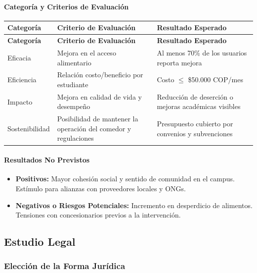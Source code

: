 \documentclass[letterpaper, 11pt]{report}
\begin{document}
\paragraph{Categoría y Criterios de Evaluación}
\begin{longtable}{|p{0.2\linewidth}|p{0.4\linewidth}|p{0.4\linewidth}|}
\hline
\textbf{Categoría} & \textbf{Criterio de Evaluación} & \textbf{Resultado Esperado} \\
\hline
\endfirsthead

\hline
\textbf{Categoría} & \textbf{Criterio de Evaluación} & \textbf{Resultado Esperado} \\
\hline
\endhead

\hline
\endfoot

\hline
\endlastfoot

Eficacia & Mejora en el acceso alimentario & Al menos 70\% de los usuarios reporta mejora \\
\hline
Eficiencia & Relación costo/beneficio por estudiante & Costo $\leq$ \$50.000 COP/mes \\
\hline
Impacto & Mejora en calidad de vida y desempeño & Reducción de deserción o mejoras académicas visibles \\
\hline
Sostenibilidad & Posibilidad de mantener la operación del comedor y regulaciones & Presupuesto cubierto por convenios y subvenciones \\
\hline
\end{longtable}

\paragraph{Resultados No Previstos}
\begin{itemize}
      \item \textbf{Positivos:} Mayor cohesión social y sentido de comunidad en el campus. Estímulo para alianzas con proveedores locales y ONGs.
      \item \textbf{Negativos o Riesgos Potenciales:} Incremento en desperdicio de alimentos. Tensiones con concesionarios previos a la intervención.
\end{itemize}

\subsection{Estudio Legal}

\subsubsection{Elección de la Forma Jurídica}
\end{document}
